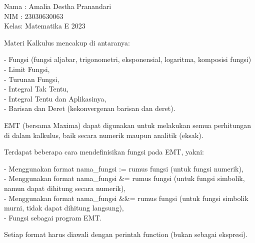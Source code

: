 \documentclass[a4paper,10pt]{article}
\begin{document}
\begin{eulernotebook}
\begin{eulercomment}
Nama : Amalia Destha Pranandari\\
NIM  : 23030630063\\
Kelas: Matematika E 2023

\begin{eulercomment}
\begin{eulercomment}
Materi Kalkulus mencakup di antaranya:

- Fungsi (fungsi aljabar, trigonometri, eksponensial, logaritma,
komposisi fungsi)\\
- Limit Fungsi,\\
- Turunan Fungsi,\\
- Integral Tak Tentu,\\
- Integral Tentu dan Aplikasinya,\\
- Barisan dan Deret (kekonvergenan barisan dan deret).

EMT (bersama Maxima) dapat digunakan untuk melakukan semua perhitungan
di dalam kalkulus, baik secara numerik maupun analitik (eksak).

\end{eulercomment}
\begin{eulercomment}
Terdapat beberapa cara mendefinisikan fungsi pada EMT, yakni:

- Menggunakan format nama\_fungsi := rumus fungsi (untuk fungsi
numerik),\\
- Menggunakan format nama\_fungsi \&= rumus fungsi (untuk fungsi
simbolik, namun dapat dihitung secara numerik),\\
- Menggunakan format nama\_fungsi \&\&= rumus fungsi (untuk fungsi
simbolik murni, tidak dapat dihitung langsung),\\
- Fungsi sebagai program EMT.

Setiap format harus diawali dengan perintah function (bukan sebagai
ekspresi).


\end{eulercomment}
\end{eulercomment}
\end{eulercomment}
\end{eulernotebook}
\end{document}
